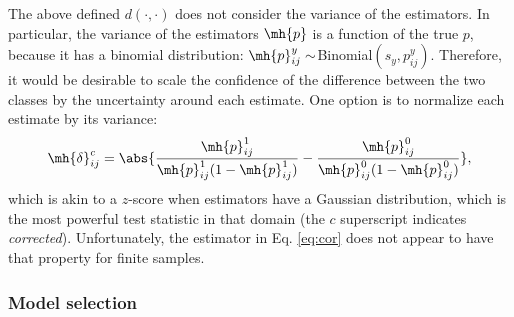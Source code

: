 The above defined $d(\cdot,\cdot)$ does not consider the variance of the estimators.  In particular, the variance of the estimators $\mh{p}$ is a function of the true $p$, because it has a binomial distribution: $\mh{p}_{ij}^y \sim$Binomial$(s_y,p_{ij}^y)$.  Therefore, it would be desirable to scale the confidence of the difference between the two classes by the uncertainty around each estimate.  One option is to normalize each estimate by its variance:
\begin{align} \label{eq:cor}
	\mh{\delta}_{ij}^c=  \abs{ \frac{\mh{p}^1_{ij}}{\mh{p}^1_{ij} (1-\mh{p}^1_{ij})} -  \frac{\mh{p}^0_{ij}}{\mh{p}^0_{ij} (1-\mh{p}^0_{ij})}},
\end{align}
which is akin to a $z$-score when estimators have a Gaussian distribution, which is the most powerful test statistic in that domain (the $c$ superscript indicates \emph{corrected}).  Unfortunately, the estimator in Eq. \eqref{eq:cor}  does not appear to have that property for finite samples.



\subsubsection{Model selection} %
\label{sub:model_selection}

